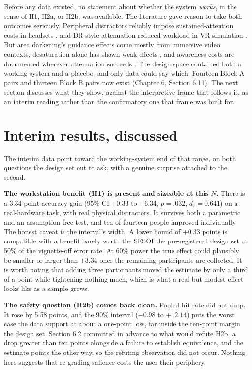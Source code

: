 Before any data existed, no statement about whether the system \textit{works}, in the sense of H1,
H2a, or H2b, was available. The literature gave reason to take both outcomes seriously. Peripheral
distractors reliably impose sustained-attention costs in headsets \citep{ai2025}, and DR-style
attenuation reduced workload in VR simulation \citep{mclaughlin2025}. But area darkening's guidance
effects come mostly from immersive video contexts, desaturation alone has shown weak effects \citep{wang2020}, and awareness costs are documented wherever attenuation succeeds \citep{murph2021}. The design space contained both a working system and a placebo, and only data could say which.
Fourteen Block A pairs and thirteen Block B pairs now exist (Chapter 6, Section 6.11). The next
section discusses what they show, against the interpretive frame that follows it, as an interim reading rather than the
confirmatory one that frame was built for.

\section{Interim results, discussed}

The interim data point toward the working-system end of that range, on both questions the design set
out to ask, with a genuine surprise attached to the second.

\textbf{The workstation benefit (H1) is present and sizeable at this $N$.} There is a 3.34-point
accuracy gain (95\% CI +0.33 to +6.34, $p = .032$, $d_z = 0.641$) on a real-hardware task, with real
physical distractors. It survives both a parametric and an assumption-free test, and ten of fourteen
people improved individually. The honest caveat is the interval's width. A lower bound of +0.33
points is compatible with a benefit barely worth the SESOI the pre-registered design set at 50\% of
the vignette-off error rate. At 60\% power the true effect could plausibly be smaller or larger than
+3.34 once the remaining participants are collected. It is worth noting that adding three
participants moved the estimate by only a third of a point while tightening nothing much, which is
what a real but modest effect looks like as a sample grows.

\textbf{The safety question (H2b) comes back clean.} Pooled hit rate did not drop. It rose by 5.58
points, and the 90\% interval ($-0.98$ to $+12.14$) puts the worst case the data support at about a
one-point loss, far inside the ten-point margin the design set. Section 6.2 committed in advance to
what would refute H2b, a drop greater than ten points alongside a failure to establish equivalence,
and the estimate points the other way, so the refuting observation did not occur. Nothing here
suggests that re-grading salience costs the user their periphery.


